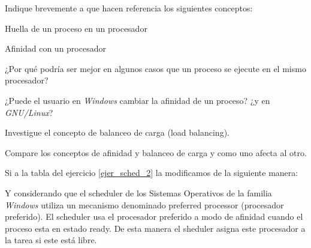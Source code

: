 \begin{questions}
\question Indique brevemente a que hacen referencia los siguientes conceptos:
\begin{parts}
	\item Huella de un proceso en un procesador
	\item Afinidad con un procesador
	\item ¿Por qué podría ser mejor en algunos casos que un proceso se ejecute en el mismo procesador?
	\item ¿Puede el usuario en \emph{Windows} cambiar la afinidad de un proceso? ¿y en \emph{GNU/Linux}?
	\item Investigue el concepto de balanceo de carga (load balancing).
	\item Compare los conceptos de afinidad y balanceo de carga y como uno afecta al otro.
\end{parts}

\question Si a la tabla del ejercicio \ref{ejer_sched_2} la modificamos de la siguiente manera:
\begin{table}[h]
  \centering
\end{table}
Y considerando que el scheduler de los Sistemas Operativos de la familia \emph{Windows} utiliza un mecanismo denominado preferred processor (procesador preferido). El scheduler usa el procesador preferido a modo de afinidad cuando el proceso esta en estado ready. De esta manera el sheduler asigna este procesador a la tarea si este está libre.
\end{questions}
